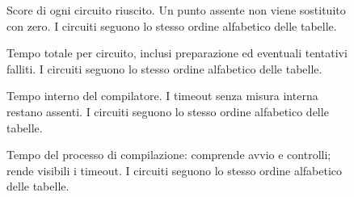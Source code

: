 \begin{figure}[!htbp]\centering

\caption{Score di ogni circuito riuscito. Un punto assente non viene sostituito con zero. I circuiti seguono lo stesso ordine alfabetico delle tabelle.}
\end{figure}

\begin{figure}[!htbp]\centering

\caption{Tempo totale per circuito, inclusi preparazione ed eventuali tentativi falliti. I circuiti seguono lo stesso ordine alfabetico delle tabelle.}
\end{figure}

\begin{figure}[!htbp]\centering

\caption{Tempo interno del compilatore. I timeout senza misura interna restano assenti. I circuiti seguono lo stesso ordine alfabetico delle tabelle.}
\end{figure}

\begin{figure}[!htbp]\centering

\caption{Tempo del processo di compilazione: comprende avvio e controlli; rende visibili i timeout. I circuiti seguono lo stesso ordine alfabetico delle tabelle.}
\end{figure}
\FloatBarrier\clearpage
